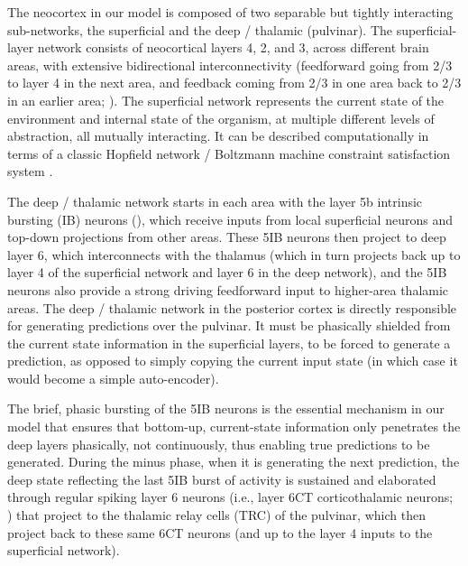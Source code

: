 \documentclass[10pt,twocolumn]{article}
\newif\myifpdf
\begin{document}
The neocortex in our model is composed of two separable but tightly interacting sub-networks, the superficial and the deep / thalamic (pulvinar).  The superficial-layer network consists of neocortical layers 4, 2, and 3, across different brain areas, with extensive bidirectional interconnectivity (feedforward going from 2/3 to layer 4 in the next area, and feedback coming from 2/3 in one area back to 2/3 in an earlier area; ). The superficial network represents the current state of the environment and internal state of the organism, at multiple different levels of abstraction, all mutually interacting.  It can be described computationally in terms of a classic Hopfield network / Boltzmann machine constraint satisfaction system \cite{Hopfield82,AckleyHintonSejnowski85}.

The deep / thalamic network starts in each area with the layer 5b intrinsic bursting (IB) neurons (), which receive inputs from local superficial neurons and top-down projections from other areas.  These 5IB neurons then project to deep layer 6, which interconnects with the thalamus (which in turn projects back up to layer 4 of the superficial network and layer 6 in the deep network), and the 5IB neurons also provide a strong driving feedforward input to higher-area thalamic areas. The deep / thalamic network in the posterior cortex is directly responsible for generating predictions over the pulvinar.  It must be phasically shielded from the current state information in the superficial layers, to be forced to generate a prediction, as opposed to simply copying the current input state (in which case it would become a simple auto-encoder).

The brief, phasic bursting of the 5IB neurons is the essential mechanism in our model that ensures that bottom-up, current-state information only penetrates the deep layers phasically, not continuously, thus enabling true predictions to be generated.  During the minus phase, when it is generating the next prediction, the deep state reflecting the last 5IB burst of activity is sustained and elaborated through regular spiking layer 6 neurons (i.e., layer 6CT corticothalamic neurons; ) that project to the thalamic relay cells (TRC) of the pulvinar, which then project back to these same 6CT neurons (and up to the layer 4 inputs to the superficial network).
\end{document}
